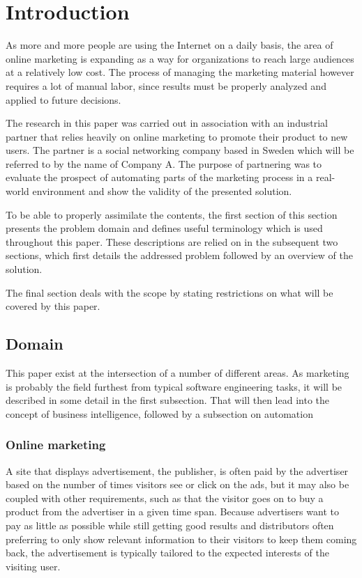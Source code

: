 \documentclass{sig-alternate}
\begin{document}
\section{Introduction}
As more and more people are using the Internet on a daily basis, the area of online marketing is expanding as a way for organizations to reach large audiences at a relatively low cost. The process of managing the marketing material however requires a lot of manual labor, since results must be properly analyzed and applied to future decisions.

The research in this paper was carried out in association with an industrial partner that relies heavily on online marketing to promote their product to new users. The partner is a social networking company based in Sweden which will be referred to by the name of Company A. The purpose of partnering was to evaluate the prospect of automating parts of the marketing process in a real-world environment and show the validity of the presented solution.

To be able to properly assimilate the contents, the first section of this section presents the problem domain and defines useful terminology which is used throughout this paper. These descriptions are relied on in the subsequent two sections, which first details the addressed problem followed by an overview of the solution.

The final section deals with the scope by stating restrictions on what will be covered by this paper.

\subsection{Domain}
This paper exist at the intersection of a number of different areas. As marketing is probably the field furthest from typical software engineering tasks, it will be described in some detail in the first subsection. That will then lead into the concept of business intelligence, followed by a subsection on automation

\subsubsection{Online marketing}
A site that displays advertisement, the publisher, is often paid by the advertiser based on the number of times visitors see or click on the ads, but it may also be coupled with other requirements, such as that the visitor goes on to buy a product from the advertiser in a given time span. Because advertisers want to pay as little as possible while still getting good results and distributors often preferring to only show relevant information to their visitors to keep them coming back, the advertisement is typically tailored to the expected interests of the visiting user.
\end{document}

